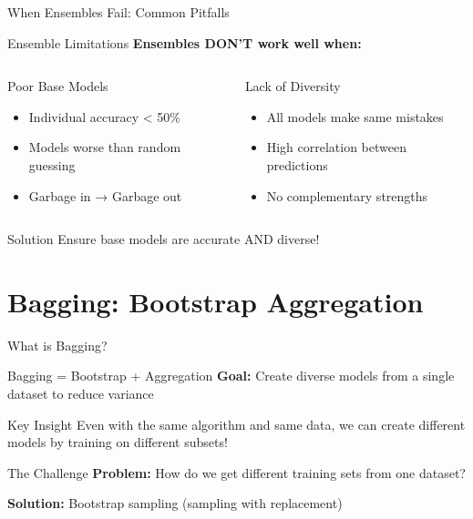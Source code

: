 \documentclass[10pt]{beamer}
\begin{document}
\begin{frame}{When Ensembles Fail: Common Pitfalls}
\begin{alertbox}{Ensemble Limitations}
\textbf{Ensembles DON'T work well when:}
\end{alertbox}

\vspace{-0.55cm}

\begin{columns}
\begin{column}{0.5\textwidth}
\begin{examplebox}{Poor Base Models}
\begin{itemize}
\item Individual accuracy < 50\%
\item Models worse than random guessing
\item Garbage in → Garbage out
\end{itemize}
\end{examplebox}
\end{column}

\begin{column}{0.5\textwidth}
\begin{examplebox}{Lack of Diversity}
\begin{itemize}
\item All models make same mistakes
\item High correlation between predictions
\item No complementary strengths
\end{itemize}
\end{examplebox}
\end{column}
\end{columns}

\begin{keypointsbox}{Solution}
Ensure base models are accurate AND diverse!
\end{keypointsbox}
\end{frame}

\section{Bagging: Bootstrap Aggregation}

\begin{frame}{What is Bagging?}
\begin{definitionbox}{Bagging = Bootstrap + Aggregation}
\textbf{Goal:} Create diverse models from a single dataset to reduce variance
\end{definitionbox}

\begin{keypointsbox}{Key Insight}
Even with the same algorithm and same data, we can create different models by training on different subsets!
\end{keypointsbox}

\begin{alertbox}{The Challenge}
\textbf{Problem:} How do we get different training sets from one dataset?

\textbf{Solution:} Bootstrap sampling (sampling with replacement)
\end{alertbox}
\end{frame}
\end{document}
